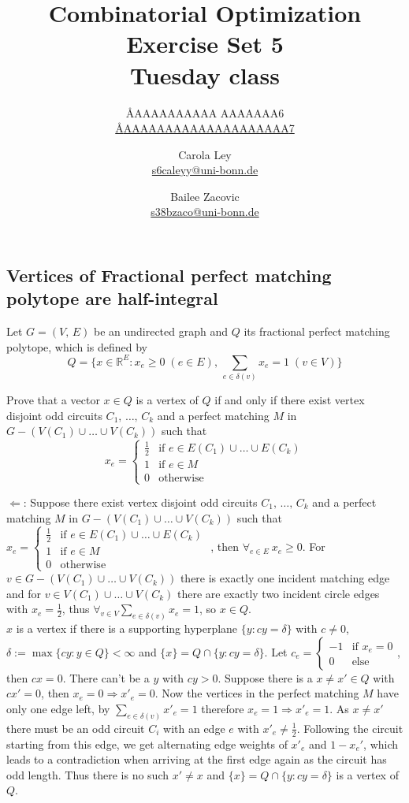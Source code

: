 \documentclass{article}
\title{Combinatorial Optimization \\ Exercise Set 5 \\ Tuesday class}
\author{
  \AA{AAAAAAAAAA AAAAAAA}{6} \\
  \href{mailto:\AA{AAAAAAAAAAAAAAAAAAAA}{7}}{\AA{AAAAAAAAAAAAAAAAAAAA}{7}}
  \and
  Carola Ley \\
  \href{mailto:s6caleyy@uni-bonn.de}{s6caleyy@uni-bonn.de}
  \and
  Bailee Zacovic \\
  \href{mailto:s38bzaco@uni-bonn.de}{s38bzaco@uni-bonn.de}
}
\newcommand{\R}{\mathbb{R}}
\begin{document}
  \maketitle

  \setcounter{section}{5}
  \subsection{Vertices of Fractional perfect matching polytope are half-integral}
  \begin{centerframebox}
    Let $G = (V,\, E)$ be an undirected graph and $Q$ its fractional perfect
    matching polytope, which is defined by
    \[ Q = \{x \in \R^E : x_e \geq 0\; (e \in E),\, \sum_{e \in \delta(v)} x_e = 1\; (v \in V)\} \]

    Prove that a vector $x \in Q$ is a vertex of $Q$ if and only if there exist vertex disjoint
    odd circuits $C_1,\, \dots,\, C_k$ and a perfect matching $M$ in $G - (V(C_1) \cup\dots\cup V(C_k))$
    such that
    \[ x_e = \begin{cases}
      \frac{1}{2} & \textrm{if } e \in E(C_1) \cup\dots\cup E(C_k) \\
      1 & \textrm{if } e \in M \\
      0 & \textrm{otherwise}
    \end{cases} \]
  \end{centerframebox}
  $\Leftarrow$: Suppose there exist vertex disjoint
    odd circuits $C_1,\, \dots,\, C_k$ and a perfect matching $M$ in $G - (V(C_1) \cup\dots\cup V(C_k))$ such that
   $  x_e = \begin{cases}
      \frac{1}{2} & \textrm{if } e \in E(C_1) \cup\dots\cup E(C_k) \\
      1 & \textrm{if } e \in M \\
      0 & \textrm{otherwise}
    \end{cases} $
    , then $\forall_{e\in E}~ x_e\geq 0$. For $v\in G - (V(C_1) \cup\dots\cup V(C_k))$ there is exactly one incident matching edge and for $v\in V(C_1) \cup\dots\cup V(C_k)$ there are exactly two incident circle  edges with $x_e=\frac 12$, thus $\forall_{v\in V} \sum_{e \in \delta(v)} x_e = 1$, so $x\in Q$.\\
    $x$ is a vertex if there is a supporting hyperplane $\{y:cy=\delta\}$ with $c\neq 0$, $\delta:= \max \{cy:y\in Q\}<\infty$ and $\{x\}=Q\cap \{y:cy=\delta\}$. Let $c_e= \begin{cases}-1 & \text{if } x_e=0\\ 0& \text{else} \end{cases} $, then $cx=0$. There can't be a $y$ with $cy>0$. Suppose there is a $x\neq x'\in Q$ with $cx'=0$, then $x_e=0 \Rightarrow x'_e=0$. Now the vertices in the perfect matching $M$ have only one edge left, by $\sum_{e \in \delta(v)} x'_e = 1$ therefore $x_e=1 \Rightarrow x'_e=1$. As $x\neq x'$ there must be an odd circuit $C_i$ with an edge $e$ with $x'_e\neq \frac 12$. Following the circuit starting from this edge, we get alternating edge weights of $x'_e$ and $1-x_e'$, which leads to a contradiction when arriving at the first edge again as the circuit has odd length. Thus there is no such $x'\neq x$ and $\{x\}=Q\cap \{y:cy=\delta\}$ is a vertex of $Q$.\\
\end{document}
